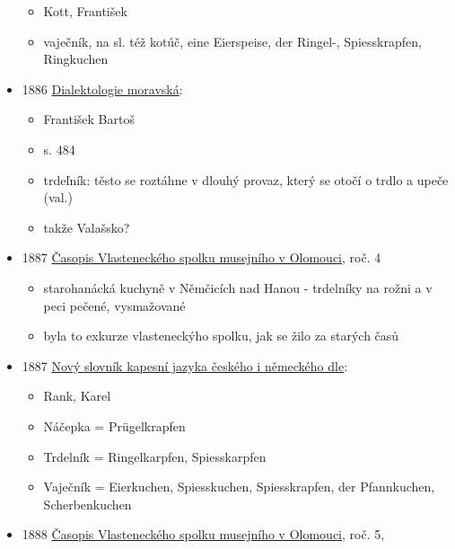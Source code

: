 \begin{itemize}
  \begin{itemize}
  \tightlist
  \item
    Kott, František
  \item
    vaječník, na sl. též kotúč, eine Eierspeise, der Ringel-,
    Spiesskrapfen, Ringkuchen
  \end{itemize}
\item
  1886
  \href{https://www.google.cz/books/edition/Dialektologie_moravsk\%C3\%A1/IWowAQAAMAAJ?hl=cs&gbpv=1&dq=trdeln\%C3\%ADk&pg=RA1-PA484&printsec=frontcover}{Dialektologie
  moravská}:

  \begin{itemize}
  \tightlist
  \item
    František Bartoš
  \item
    s. 484
  \item
    trdeľník: těsto se roztáhne v dlouhý provaz, který se otočí o trdlo
    a upeče (val.)
  \item
    takže Valašsko?
  \end{itemize}
\item
  1887
  \href{https://ndk.cz/view/uuid:58907250-abd8-11dd-9aac-000d606f5dc6?page=uuid\%3Aadeec330-246a-11e9-bc55-5ef3fc9bb22f&fulltext=trdeln\%C3\%ADky}{Časopis
  Vlasteneckého spolku musejního v Olomouci}, roč. 4

  \begin{itemize}
  \tightlist
  \item
    starohanácká kuchyně v Němčicích nad Hanou - trdelníky na rožni a v
    peci pečené, vysmažované
  \item
    byla to exkurze vlasteneckýho spolku, jak se žilo za starých časů
  \end{itemize}
\item
  1887
  \href{https://ceskadigitalniknihovna.cz/uuid/uuid:cac319e0-dea6-11e6-9964-005056825209}{Nový
  slovník kapesní jazyka českého i německého dle}:

  \begin{itemize}
  \tightlist
  \item
    Rank, Karel
  \item
    Náčepka = Prügelkrapfen
  \item
    Trdelník = Ringelkarpfen, Spiesskarpfen
  \item
    Vaječník = Eierkuchen, Spiesskuchen, Spiesskrapfen, der Pfannkuchen,
    Scherbenkuchen
  \end{itemize}
\item
  1888
  \href{https://ndk.cz/view/uuid:8d89f8c0-abdb-11dd-ae2a-000d606f5dc6?page=uuid\%3Afbdf17f0-247b-11e9-90cf-5ef3fc9bb22f}{Časopis
  Vlasteneckého spolku musejního v Olomouci}, roč. 5,


\end{itemize}
